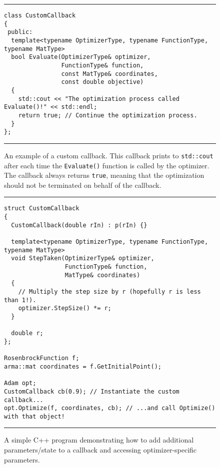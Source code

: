 \begin{figure}[!tb]
\centering
\hrule
\vspace{1ex}
\begin{verbatim}
class CustomCallback
{
 public:
  template<typename OptimizerType, typename FunctionType, typename MatType>
  bool Evaluate(OptimizerType& optimizer,
                FunctionType& function,
                const MatType& coordinates,
                const double objective)
  {
    std::cout << "The optimization process called Evaluate()!" << std::endl;
    return true; // Continue the optimization process.
  }
};
\end{verbatim}
\hrule
\vspace*{-0.5em}
\caption
  {
  An example of a custom callback.  This callback prints to {\tt std::cout}
after each time the {\tt Evaluate()} function is called by the optimizer.  The
callback always returns {\tt true}, meaning that the optimization should not be
terminated on behalf of the callback.
  }
\label{fig:example_prog_callbacks_2}
\end{figure}

\begin{figure}[t!]
\centering
\hrule
\vspace{1ex}
\begin{verbatim}
struct CustomCallback
{
  CustomCallback(double rIn) : p(rIn) {}

  template<typename OptimizerType, typename FunctionType, typename MatType>
  void StepTaken(OptimizerType& optimizer,
                 FunctionType& function,
                 MatType& coordinates)
  {
    // Multiply the step size by r (hopefully r is less than 1!).
    optimizer.StepSize() *= r;
  }

  double r;
};

RosenbrockFunction f;
arma::mat coordinates = f.GetInitialPoint();

Adam opt;
CustomCallback cb(0.9); // Instantiate the custom callback...
opt.Optimize(f, coordinates, cb); // ...and call Optimize() with that object!
\end{verbatim}
\hrule
\vspace*{-0.5em}
\caption
  {
  A simple C++ program demonstrating how to add additional parameters/state to a
callback and accessing optimizer-specific parameters.
  }
\label{fig:example_prog_callbacks_parameter}
\end{figure}

